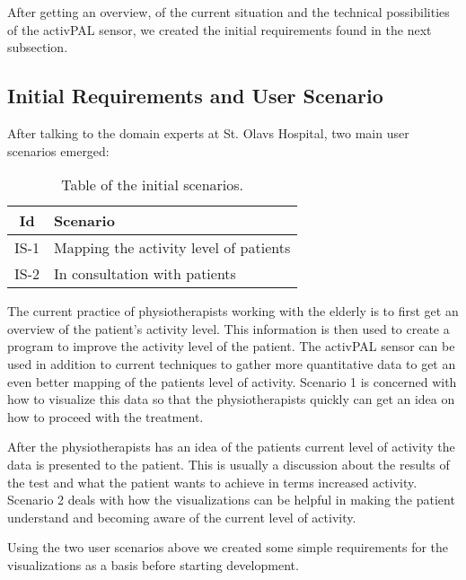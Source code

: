 After getting an overview, of the current situation and the technical possibilities of the activPAL sensor, we created the initial requirements found in the next subsection.

\subsection{Initial Requirements and User Scenario}
After talking to the domain experts at St. Olavs Hospital, two main user scenarios emerged:

\begin{table}[!h]
  \centering
  \begin{tabular}{|c|l|}
    \hline
    \textbf{Id} & \textbf{Scenario} \\ \hline
    IS-1 & Mapping the activity level of patients \\ \hline
    IS-2 & In consultation with patients \\ \hline
  \end{tabular}
  \caption{Table of the initial scenarios.}
\end{table}

The current practice of physiotherapists working with the elderly is to first get an overview of the patient's activity level. This information is then used to create a program to improve the activity level of the patient. The activPAL sensor can be used in addition to current techniques to gather more quantitative data to get an even better mapping of the patients level of activity. Scenario 1 is concerned with how to visualize this data so that the physiotherapists quickly can get an idea on how to proceed with the treatment.

After the physiotherapists has an idea of the patients current level of activity the data is presented to the patient. This is usually a discussion about the results of the test and what the patient wants to achieve in terms increased activity. Scenario 2 deals with how the visualizations can be helpful in making the patient understand and becoming aware of the current level of activity.

Using the two user scenarios above we created some simple requirements for the visualizations as a basis before starting development.

